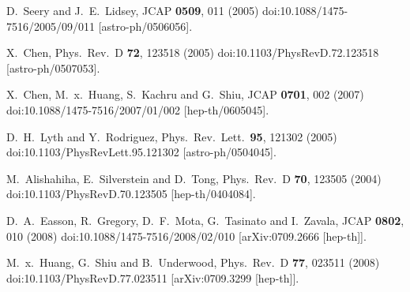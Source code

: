 \documentclass[a4paper,11pt]{article}
\begin{document}
\begin{thebibliography}{99}
  D.~Seery and J.~E.~Lidsey,
  JCAP {\bf 0509}, 011 (2005)
  doi:10.1088/1475-7516/2005/09/011
  [astro-ph/0506056].


  X.~Chen,
  Phys.\ Rev.\ D {\bf 72}, 123518 (2005)
  doi:10.1103/PhysRevD.72.123518
  [astro-ph/0507053].


  X.~Chen, M.~x.~Huang, S.~Kachru and G.~Shiu,
  JCAP {\bf 0701}, 002 (2007)
  doi:10.1088/1475-7516/2007/01/002
  [hep-th/0605045].


  D.~H.~Lyth and Y.~Rodriguez,
  Phys.\ Rev.\ Lett.\  {\bf 95}, 121302 (2005)
  doi:10.1103/PhysRevLett.95.121302
  [astro-ph/0504045].


  M.~Alishahiha, E.~Silverstein and D.~Tong,
  Phys.\ Rev.\ D {\bf 70}, 123505 (2004)
  doi:10.1103/PhysRevD.70.123505
  [hep-th/0404084].


  D.~A.~Easson, R.~Gregory, D.~F.~Mota, G.~Tasinato and I.~Zavala,
  JCAP {\bf 0802}, 010 (2008)
  doi:10.1088/1475-7516/2008/02/010
  [arXiv:0709.2666 [hep-th]].


  M.~x.~Huang, G.~Shiu and B.~Underwood,
  Phys.\ Rev.\ D {\bf 77}, 023511 (2008)
  doi:10.1103/PhysRevD.77.023511
  [arXiv:0709.3299 [hep-th]].



\end{thebibliography}
\end{document}
